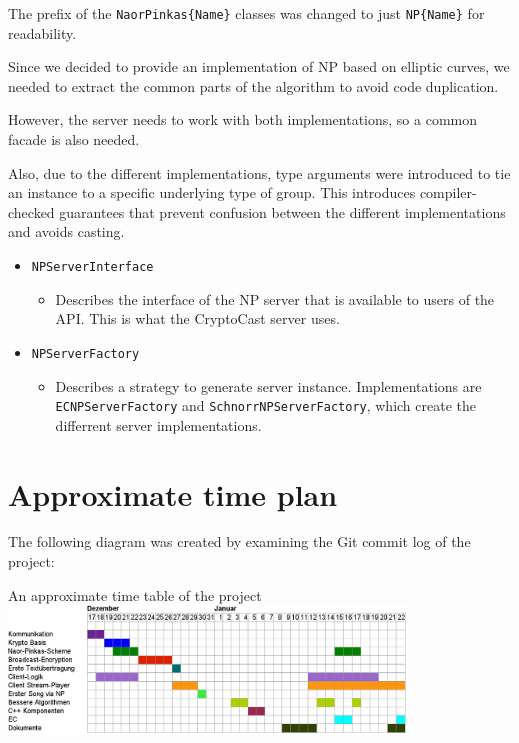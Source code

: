 \documentclass[a4paper,10pt]{scrartcl}
\begin{document}
The prefix of the \lstinline|NaorPinkas{Name}| classes was changed to just \lstinline|NP{Name}| for readability.

Since we decided to provide an implementation of NP based on elliptic curves, we needed to extract
the common parts of the algorithm to avoid code duplication.

However, the server needs to work with both implementations, so a common facade is also needed.

Also, due to the different implementations, type arguments were introduced to tie an instance
to a specific underlying type of group. This introduces compiler-checked guarantees that prevent
confusion between the different implementations and avoids casting.

\begin{itemize}
  \item \lstinline|NPServerInterface|
  \begin{itemize}
    \item Describes the interface of the NP server that is available to users of the API.
          This is what the CryptoCast server uses.
  \end{itemize}

  \item \lstinline|NPServerFactory|
  \begin{itemize}
    \item Describes a strategy to generate server instance. Implementations are
          \lstinline|ECNPServerFactory| and \lstinline|SchnorrNPServerFactory|, which
          create the differrent server implementations.
  \end{itemize}
\end{itemize}

\section{Approximate time plan}

The following diagram was created by examining the Git commit log of the project:

\begin{illustration}{An approximate time table of the project}
\includegraphics[width=400px]{timetable.png}
\end{illustration}
\end{document}
